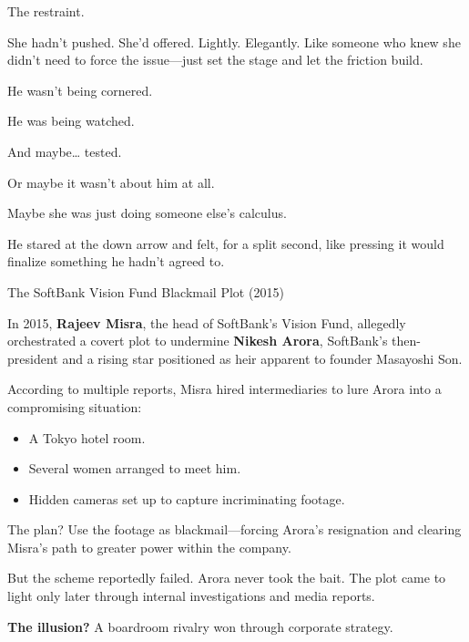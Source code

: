 The restraint.

She hadn’t pushed. She’d offered. Lightly. Elegantly. Like someone who knew she didn’t need to 
force the issue—just set the stage and let the friction build.

He wasn’t being cornered.

He was being watched.

And maybe… tested.

Or maybe it wasn’t about him at all.

Maybe she was just doing someone else’s calculus.

He stared at the down arrow and felt, for a split second, like pressing it would finalize 
something he hadn’t agreed to.

\medskip

\begin{HistoricalSidebar}{The SoftBank Vision Fund Blackmail Plot (2015)}
  
  In 2015, \textbf{Rajeev Misra}, the head of SoftBank’s Vision Fund, allegedly orchestrated 
  a covert plot to undermine \textbf{Nikesh Arora}, SoftBank’s then-president and a rising 
  star positioned as heir apparent to founder Masayoshi Son.
  
  \medskip
  
  According to multiple reports, Misra hired intermediaries to lure Arora into a compromising 
  situation:  
  
  \medskip
  
  \begin{itemize}
    \item A Tokyo hotel room.
    \item Several women arranged to meet him.
    \item Hidden cameras set up to capture incriminating footage.
  \end{itemize}

  \medskip
  
  The plan?  Use the footage as blackmail—forcing Arora’s resignation and clearing Misra’s 
  path to greater power within the company.
  
  \medskip
  
  But the scheme reportedly failed. Arora never took the bait. The plot came to light only 
  later through internal investigations and media reports.
  
  \medskip
  
  \textbf{The illusion?} A boardroom rivalry won through corporate strategy.
  

\end{HistoricalSidebar}
